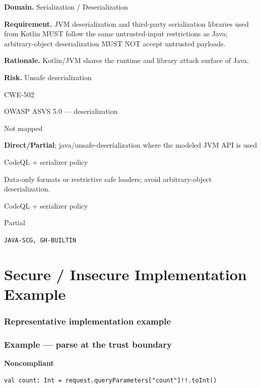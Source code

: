 \documentclass[10pt,letterpaper]{article}
\newcommand{\prioritybadge}[2]{\tcbox[on line,boxrule=0pt,arc=1.2mm,boxsep=0.7mm,left=1mm,right=1mm,top=0.4mm,bottom=0.4mm,colback=#2!12,coltext=#2]{\scriptsize\bfseries #1}}
\begin{document}
\begin{rulebox}[title={\texttt{SCS-KOTLIN-DESER-001} \hfill \prioritybadge{Critical Control}{Critical}}]
\textbf{Domain.} Serialization / Deserialization

\textbf{Requirement.} JVM deserialization and third-party serialization libraries used from Kotlin MUST follow the same untrusted-input restrictions as Java; arbitrary-object deserialization MUST NOT accept untrusted payloads.

\textbf{Rationale.} Kotlin/JVM shares the runtime and library attack surface of Java.

\textbf{Risk.} Unsafe deserialization

\begin{description}[leftmargin=2.65cm,labelwidth=2.3cm,style=nextline,itemsep=1pt,topsep=3pt]
  \item[CWE] CWE-502
  \item[OWASP] OWASP ASVS 5.0 --- deserialization
  \item[CERT] Not mapped
  \item[CodeQL] \textbf{Direct/Partial}; java/unsafe-deserialization where the modeled JVM API is used
  \item[Enforcement] CodeQL + serializer policy
  \item[Prevention] Data-only formats or restrictive safe loaders; avoid arbitrary-object deserialization.
  \item[Verification] CodeQL + serializer policy
  \item[Automation] Partial
  \item[Sources] \texttt{JAVA-SCG, GH-BUILTIN}
\end{description}
\end{rulebox}
\section{Secure / Insecure Implementation Example}
\subsubsection*{Representative implementation example}
\subsubsection*{Example --- parse at the trust boundary}

\textbf{Noncompliant}\par
\begin{lstlisting}
val count: Int = request.queryParameters["count"]!!.toInt()
\end{lstlisting}
\end{document}
